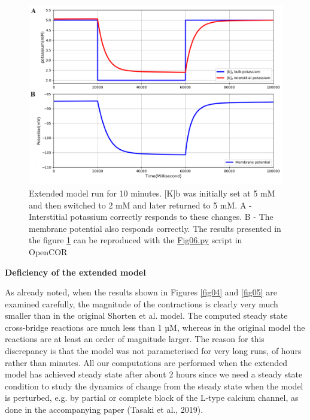 \documentclass[fleqn,10pt]{physiome}
\begin{document}
\begin{figure}[ht]
\centering
\includegraphics[width=0.9\linewidth]{fig06}
\caption{Extended model run for 10 minutes. [K]b was initially set at 5 mM and then switched to 2 mM and later returned to 5 mM. A - Interstitial potassium correctly responds to these changes. B - The membrane potential also responds correctly. The results presented in the figure \ref{fig06} can be reproduced with the \href{https://models.physiomeproject.org/workspace/5c6/file/afd4d5cb20ecdcbc0b10198fe31795520488a34e/Fig06.py}{Fig06.py} script in OpenCOR} 
\label{fig06}
\end{figure}

\textbf{Deficiency of the extended model}\newline

As already noted, when the results shown in Figures \ref{fig04} and \ref{fig05} are examined carefully, the magnitude of the contractions is clearly very much smaller than in the original Shorten et al. model. The computed steady state cross-bridge reactions are much less than 1 µM, whereas in the original model the reactions are at least an order of magnitude larger.  The reason for this discrepancy is that the model was not parameterised for very long runs, of hours rather than minutes. All our computations are performed when the extended model has achieved steady state after about 2 hours since we need a steady state condition to study the dynamics of change from the steady state when the model is perturbed, e.g. by partial or complete block of the L-type calcium channel, as done in the accompanying paper (Tasaki et al., 2019).
\end{document}
